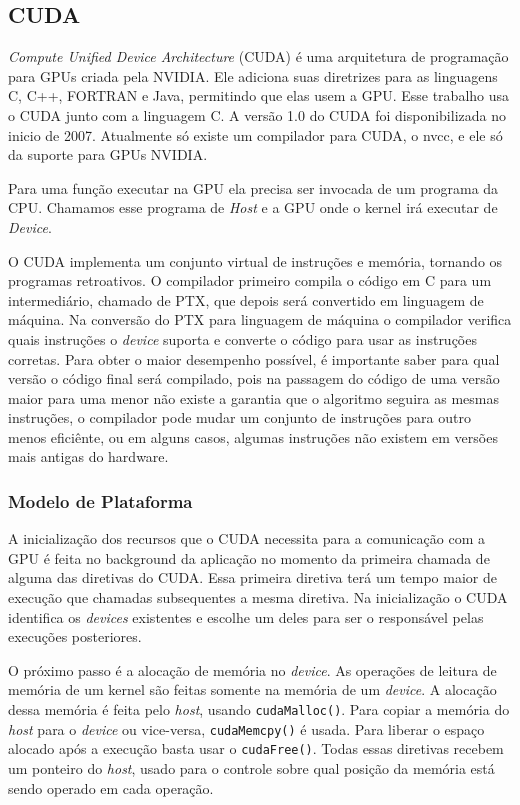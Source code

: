 \subsection{CUDA}
\textit{Compute Unified Device Architecture} (CUDA) é uma arquitetura de programação para GPUs criada pela NVIDIA.
Ele adiciona suas diretrizes para as linguagens C, C++, FORTRAN e Java, permitindo que elas usem a GPU.
Esse trabalho usa o CUDA junto com a linguagem C.
A versão 1.0 do CUDA foi disponibilizada no inicio de 2007. Atualmente só existe um compilador para CUDA, o nvcc,
e ele só da suporte para GPUs NVIDIA.

Para uma função executar na GPU ela precisa ser invocada de um programa da CPU. Chamamos esse programa de \textit{Host}
e a GPU onde o kernel irá executar de \textit{Device}.

O CUDA implementa um conjunto virtual de instruções e memória, tornando os programas retroativos. O compilador
primeiro compila o código em C para um intermediário, chamado de PTX, que depois será convertido em linguagem
de máquina. Na conversão do PTX para linguagem de máquina o compilador verifica quais instruções o \textit{device}
suporta e converte o código para usar as instruções corretas.
Para obter o maior desempenho possível, é importante saber para qual versão o código final será compilado, 
pois na passagem do código de uma versão maior para uma menor não existe a garantia que o algoritmo seguira as mesmas instruções, 
o compilador pode mudar um conjunto de instruções para outro menos eficiênte, ou em alguns casos, algumas instruções não existem em
versões mais antigas do hardware.

\subsubsection{Modelo de Plataforma}
A inicialização dos recursos que o CUDA necessita para a comunicação com a GPU é feita no background da
aplicação no momento da primeira chamada de alguma das diretivas do CUDA. Essa primeira diretiva terá um
tempo maior de execução que chamadas subsequentes a mesma diretiva. Na inicialização o CUDA identifica
os \textit{devices} existentes e escolhe um deles para ser o responsável pelas execuções posteriores.

O próximo passo é a alocação de memória no \textit{device}. As operações de leitura de memória de um kernel são feitas somente
na memória de um \textit{device}. A alocação dessa memória é feita pelo \textit{host}, usando \verb#cudaMalloc()#. 
Para copiar a memória do \textit{host} para o \textit{device} ou vice-versa,
\verb#cudaMemcpy()# é usada. Para liberar o espaço alocado após a execução basta usar o \verb#cudaFree()#.
Todas essas diretivas recebem um ponteiro do \textit{host}, usado para o controle sobre qual posição da memória está sendo
operado em cada operação.

